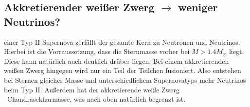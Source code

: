     \subsection{Akkretierender weißer Zwerg $\to$ weniger Neutrinos?}

    \justifying einer Typ II Supernova zerfällt der gesamte Kern zu Neutronen und Neutrinos. Hierbei ist die Vorraussetzung, dass
    die Sternmasse vorher bei $M>1.4M_{\odot}$ liegt. Diese kann natürlich auch deutlich drüber liegen. Bei einem akkretierenden weißen Zwerg hingegen
    wird nur ein Teil der Teilchen fusioniert. Also entstehen bei Sternen gleicher Masse und unterschiedlichem Supernovatyps mehr Neutrinos 
    beim Typ II. Außerdem hat der akkretierende weiße Zwerg ~Chandrasekharmasse, was nach oben natürlich begrenzt ist. 


